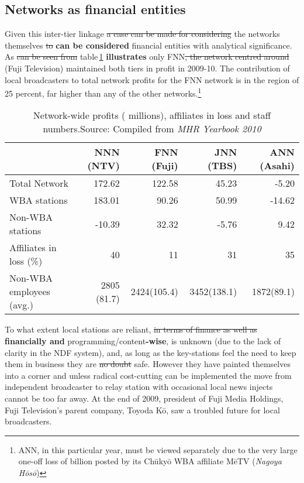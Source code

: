 \documentclass[11pt, oneside, a4paper, headsepline]{scrartcl}
\newcommand{\ty}{\textyen}
\begin{document}
\subsection{Networks as financial entities}
Given this inter-tier linkage \st{a case can be made for considering} the networks themselves \st{to} \textbf{can be considered} financial entities with analytical significance. As \st{can be seen from} table\,\ref{net-profit} \textbf{illustrates} only FNN\st{, the network centred around} (Fuji Television) maintained both tiers in profit in 2009-10. The contribution of local broadcasters to total network profits for the FNN network is in the region of 25 percent, far higher than any of the other networks.\footnote{ANN, in this particular year, must be viewed separately due to the very large one-off loss of \ty4.9 billion posted by its Chūkyō WBA affiliate MēTV (\textit{Nagoya H\={o}s\={o}})}

\begin{table}[t]%
\begin{center}
\begin{tabular}{lrrrr}
\toprule
{ } &				{NNN (NTV)} & 	{FNN (Fuji)} &		{JNN (TBS)} &		{ANN (Asahi)} \\ \midrule
Total Network & 	172.62 & 		122.58 & 		45.23 & 			-5.20 \\ 
WBA stations & 	183.01 & 		90.26 & 			50.99 & 			-14.62 \\ 
Non-WBA stations & -10.39 & 		32.32 & 			-5.76 & 			9.42 \\ \midrule
Affiliates in loss (\%) &40&			11&				31&				35 \\ \midrule
Non-WBA employees (avg.)  &2805 (81.7)&2424(105.4) 	&3452(138.1) 		&1872(89.1) \\
\bottomrule
\end{tabular}
\caption{\label{net-profit}Network-wide profits (\ty 100 millions), affiliates in loss and staff numbers.\newline \footnotesize Source: Compiled from \emph{MHR Yearbook 2010}}
\end{center}

\end{table}

To what extent local stations are reliant, \st{in terms of finance as well as} \textbf{financially and} programming/content\textbf{-wise}, is unknown (due to the lack of clarity in the NDF system), and, as long as the key-stations feel the need to keep them in business they are \st{no doubt} safe. However they have painted themselves into a corner and unless radical cost-cutting can be implemented the move from independent broadcaster to relay station with occasional local news injects cannot be too far away. At the end of 2009, president of Fuji Media Holdings, Fuji Television's parent company, Toyoda K\={o}, saw a troubled future for local broadcasters.
\end{document}
